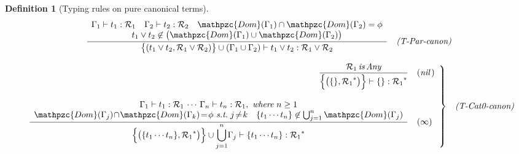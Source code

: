 \documentclass[12pt]{article}
\newtheorem{Definition}{Definition}[section]
\begin{document}
\begin{Definition}[Typing rules on pure canonical terms]
\begin{displaymath}
\begin{array}{c}
\begin{array}{rl}
        \dfrac{
          \begin{array}{c}
            \Gamma_1 \vdash t_1 : \mathcal{R}_1
             \quad \Gamma_2 \vdash t_2 : \mathcal{R}_2
              \quad \mathpzc{Dom}(\Gamma_1) \cap \mathpzc{Dom}(\Gamma_2)
               = \phi  \\
            t_1 \vee t_2 \not\in \bigl(\mathpzc{Dom}(\Gamma_1) \cup
             \mathpzc{Dom}(\Gamma_2) \bigr)
          \end{array}
        }{
          \bigl\{(t_1 \vee t_2, \mathcal{R}_1 \vee \mathcal{R}_2) \bigr\}
           \cup (\Gamma_1 \cup \Gamma_2) \vdash
            t_1 \vee t_2 : \mathcal{R}_1 \vee \mathcal{R}_2
        }  &  \text{\it (T-Par-canon)}
      \end{array}  \\
      \\
      
      \begin{array}{rl}
        \left. \begin{array}{rl}
          \dfrac{
            \mathcal{R}_1\,\text{\it is}\, \text{\it Any}
          }{
            \Bigl\{\bigl(\{\}, {\mathcal{R}_1}^* \bigr) \Bigr\} \vdash
             \{\}: {\mathcal{R}_1}^*
          }  &  (\text{\it nil}\,)  \\
          \\
          \dfrac{
            \begin{array}{c}
              \Gamma_1 \vdash t_1 : \mathcal{R}_1 \,\cdots\,
               \Gamma_n \vdash t_n : \mathcal{R}_1,\
                \text{\it where}\ n \ge 1  \\
              \mathpzc{Dom}(\Gamma_j) \!\cap\! \mathpzc{Dom}(\Gamma_k) \!=\!
               \phi \ \text{\it s.t.}\; j \!\neq\! k
              \quad \{t_1 \cdots t_n \} \not\in
               \bigcup_{j=1}^{n}\mathpzc{Dom}(\Gamma_j)
            \end{array}
          }{
            \Bigl\{\bigl(\{t_1 \cdots t_n \}, {\mathcal{R}_1}^* \bigr)
             \Bigr\} \cup {\displaystyle \bigcup_{j = 1}^{n}} \Gamma_j
              \vdash \{t_1 \cdots t_n \} : {\mathcal{R}_1}^*
          }  &  (\infty)
        \end{array} \right\}  &  \text{\it (T-Cat0-canon)}
      \end{array}  \\
      \\
      

\end{array}
\end{displaymath}
\end{Definition}
\end{document}
